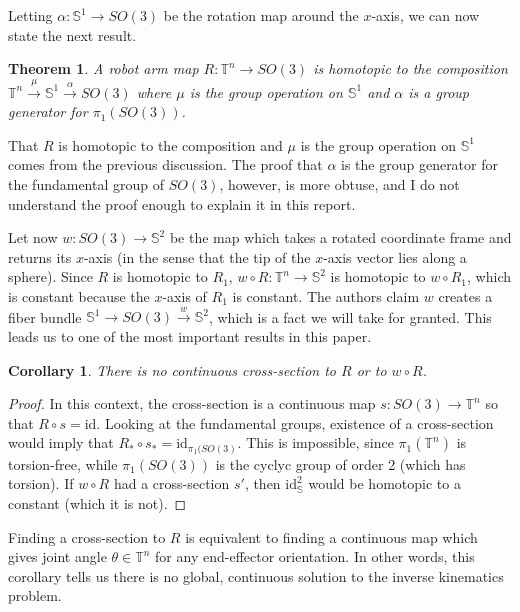 \documentclass[12pt]{article}
\newtheorem{thm}{Theorem}
\newtheorem*{cor}{Corollary}
\theoremstyle{definition}
\begin{document}
Letting \(\alpha : \mathbb{S}^1 \rightarrow SO(3)\) be the rotation map around
the \(x\)-axis, we can now state the next result.
\begin{thm}
    A robot arm map \(R : \mathbb{T}^n \rightarrow SO(3)\) is homotopic to 
    the composition 
    \(\mathbb{T}^n \xrightarrow{\mu} \mathbb{S}^1 \xrightarrow{\alpha} SO(3)\)
    where \(\mu\) is the group operation on \(\mathbb{S}^1\) and \(\alpha\) is a
    group generator for \(\pi_1\left(SO(3)\right)\).
\end{thm}

That \(R\) is homotopic to the composition and \(\mu\) is the group operation on
\(\mathbb{S}^1\) comes from the previous discussion. The proof that \(\alpha\)
is the group generator for the fundamental group of \(SO(3)\), however, is more
obtuse, and I do not understand the proof enough to explain it in this report. 

Let now \(w : SO(3) \rightarrow \mathbb{S}^2\) be the map which takes a rotated
coordinate frame and returns its \(x\)-axis (in the sense that the tip of the
\(x\)-axis vector lies along a sphere).
Since \(R\) is homotopic to \(R_1\), 
\(w \circ R : \mathbb{T}^n \rightarrow \mathbb{S}^2\) is homotopic to 
\(w \circ R_1\), which is constant because the \(x\)-axis of \(R_1\) is
constant. The authors claim \(w\) creates a fiber bundle 
\(\mathbb{S}^1 \rightarrow SO(3) \xrightarrow{w} \mathbb{S}^2\), which is a fact
we will take for granted. This leads us to one of the most important results in
this paper.

\begin{cor}
    There is no continuous cross-section to \(R\) or to \(w \circ R\).
\end{cor}
\begin{proof}
    In this context, the cross-section is a continuous map 
    \(s : SO(3) \rightarrow \mathbb{T}^n\) so that \(R \circ s = \text{id}\). 
    Looking at the fundamental groups, existence of a cross-section would imply
    that \(R_* \circ s_* = \text{id}_{\pi_1(SO(3)}\). This is impossible, since
    \(\pi_1(\mathbb{T}^n)\) is torsion-free, while
    \(\pi_1(SO(3))\) is the cyclyc group of order 2 (which has torsion). 
    If \(w \circ R\) had a cross-section \(s'\), then \(\text{id}_\mathbb{S}^2\)
    would be homotopic to a constant (which it is not).
\end{proof}

Finding a cross-section to \(R\) is equivalent to finding a continuous map which
gives joint angle \(\theta \in \mathbb{T}^n\) for any end-effector orientation.
In other words, this corollary tells us there is no global, continuous solution
to the inverse kinematics problem.
\end{document}
